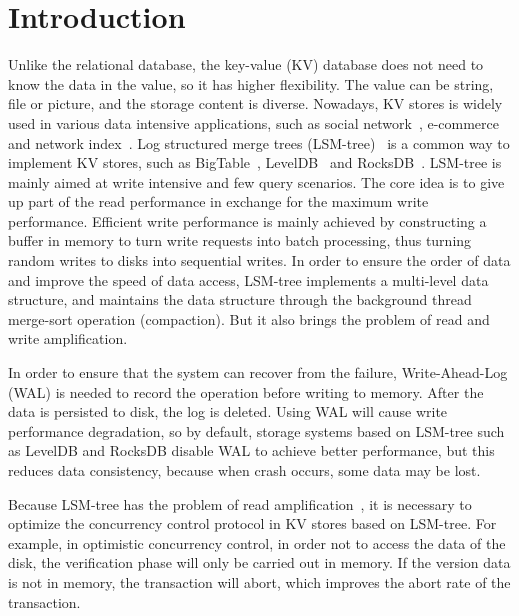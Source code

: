 \section{Introduction}

Unlike the relational database, the key-value (KV) database does not need to know the data in the value, so it has higher flexibility. The value can be string, file or picture, and the storage content is diverse. Nowadays, KV stores is widely used in various data intensive applications, such as social network~\cite{RocksDB}, e-commerce~\cite{Dynamo} and network index~\cite{Bigtable}. Log structured merge trees (LSM-tree)~\cite{LSM-tree} is a common way to implement KV stores, such as BigTable~\cite{Bigtable}, LevelDB~\cite{LevelDB} and RocksDB~\cite{RocksDB}. LSM-tree is mainly aimed at write intensive and few query scenarios. The core idea is to give up part of the read performance in exchange for the maximum write performance. Efficient write performance is mainly achieved by constructing a buffer in memory to turn write requests into batch processing, thus turning random writes to disks into sequential writes. In order to ensure the order of data and improve the speed of data access, LSM-tree implements a multi-level data structure, and maintains the data structure through the background thread merge-sort operation (compaction). But it also brings the problem of read and write amplification.

In order to ensure that the system can recover from the failure, Write-Ahead-Log (WAL) is needed to record the operation before writing to memory. After the data is persisted to disk, the log is deleted. Using WAL will cause write performance degradation, so by default, storage systems based on LSM-tree such as LevelDB and RocksDB disable WAL to achieve better performance, but this reduces data consistency, because when crash occurs, some data may be lost.

Because LSM-tree has the problem of read amplification~\cite{WiscKey,NVMKV,PebblesDB}, it is necessary to optimize the concurrency control protocol in KV stores based on LSM-tree. For example, in optimistic concurrency control, in order not to access the data of the disk, the verification phase will only be carried out in memory. If the version data is not in memory, the transaction will abort, which improves the abort rate of the transaction.

